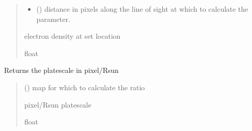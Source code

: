 \documentclass[letterpaper,10pt,english]{sphinxmanual}
\begin{document}
\begin{fulllineitems}
\begin{quote}
\begin{description}
\begin{itemize}
\item {} 
\sphinxAtStartPar
{} () \textendash{} distance in pixels along the line of sight at which to calculate the parameter.

\end{itemize}

\sphinxAtStartPar
electron density at set location

\sphinxAtStartPar
float

\end{description}\end{quote}

\end{fulllineitems}


\begin{fulllineitems}
\label{\detokenize{doppler_dimming_lib:doppler_dimming_lib.metis.get_ne_map}}
\pysigstartsignatures
{}
\pysigstopsignatures
\end{fulllineitems}


\begin{fulllineitems}
\label{\detokenize{doppler_dimming_lib:doppler_dimming_lib.metis.get_pix_to_rsun}}
\pysigstartsignatures
{}
\pysigstopsignatures
\sphinxAtStartPar
Returns the platescale in pixel/Rsun
\begin{quote}\begin{description}
\sphinxAtStartPar
{} () \textendash{} map for which to calculate the ratio

\sphinxAtStartPar
pixel/Rsun platescale

\sphinxAtStartPar
float

\end{description}\end{quote}

\end{fulllineitems}
\end{document}
